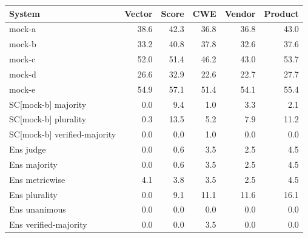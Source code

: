 \begin{tabular}{lrrrrr}
\toprule
System & Vector & Score & CWE & Vendor & Product \\
\midrule
mock-a & 38.6 & 42.3 & 36.8 & 36.8 & 43.0 \\
mock-b & 33.2 & 40.8 & 37.8 & 32.6 & 37.6 \\
mock-c & 52.0 & 51.4 & 46.2 & 43.0 & 53.7 \\
mock-d & 26.6 & 32.9 & 22.6 & 22.7 & 27.7 \\
mock-e & 54.9 & 57.1 & 51.4 & 54.1 & 55.4 \\
\midrule
SC[mock-b] majority & 0.0 & 9.4 & 1.0 & 3.3 & 2.1 \\
SC[mock-b] plurality & 0.3 & 13.5 & 5.2 & 7.9 & 11.2 \\
SC[mock-b] verified-majority & 0.0 & 0.0 & 1.0 & 0.0 & 0.0 \\
\midrule
Ens judge & 0.0 & 0.6 & 3.5 & 2.5 & 4.5 \\
Ens majority & 0.0 & 0.6 & 3.5 & 2.5 & 4.5 \\
Ens metricwise & 4.1 & 3.8 & 3.5 & 2.5 & 4.5 \\
Ens plurality & 0.0 & 9.1 & 11.1 & 11.6 & 16.1 \\
Ens unanimous & 0.0 & 0.0 & 0.0 & 0.0 & 0.0 \\
Ens verified-majority & 0.0 & 0.0 & 3.5 & 0.0 & 0.0 \\
\bottomrule
\end{tabular}
